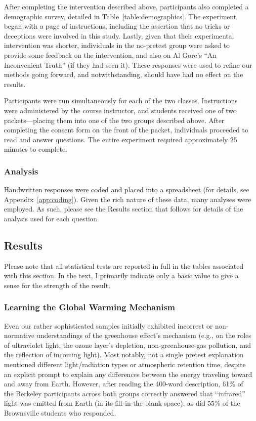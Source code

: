 After completing the intervention described above, participants also
completed a demographic survey, detailed in Table~\ref{table:demographics}.
The experiment began with a page of instructions, including the assertion that
no tricks or deceptions were involved in this study. Lastly, given that their
experimental intervention was shorter, individuals in the no-pretest group
were asked to provide some feedback on the intervention, and also on Al Gore’s
“An Inconvenient Truth” (if they had seen it). These responses were used to
refine our methods going forward, and \textcite{bem_feeling_2011} notwithstanding,
should have had no effect on the results.

Participants were run simultaneously for each of the two classes. Instructions
were administered by the course instructor, and students received one of two
packets---placing them into one of the two groups described above. After
completing the consent form on the front of the packet, individuals proceeded to
read and answer questions. The entire experiment required approximately
25 minutes to complete.

\subsubsection{Analysis}

Handwritten responses were coded and placed into a spreadsheet (for details, see
Appendix~\ref{app:coding}). Given the rich nature of these data, many analyses
were employed. As such, please see the Results section that follows for details
of the analysis used for each question.

\subsection{Results}

Please note that all statistical tests are reported in full in the tables
associated with this section. In the text, I primarily indicate only a basic
value to give a sense for the strength of the result.

\subsubsection{Learning the Global Warming Mechanism}

Even our rather sophisticated samples initially exhibited incorrect or
non-normative understandings of the greenhouse effect’s mechanism (e.g., on the
roles of ultraviolet light, the ozone layer’s depletion, non-greenhouse-gas
pollution, and the reflection of incoming light). Most notably, not a single
pretest explanation mentioned different light/radiation types or atmospheric
retention time, despite an explicit prompt to explain any differences between
the energy traveling toward and away from Earth. However, after reading the
400-word description, 61\% of the Berkeley participants across both groups
correctly answered that “infrared” light was emitted from Earth (in its
fill-in-the-blank space), as did 55\% of the Brownsville students who responded.

